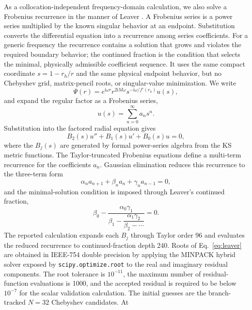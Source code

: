 \documentclass[12pt,a4paper]{article}
\newcommand{\ii}{\mathrm{i}}
\begin{document}
As a collocation-independent frequency-domain calculation, we also solve a Frobenius
recurrence in the manner of Leaver \cite{Leaver1985,Nollert1993}.  A Frobenius
series is a power series multiplied by the known singular behavior at an
endpoint.  Substitution converts the differential equation into a recurrence
among series coefficients.  For a generic frequency the recurrence contains a
solution that grows and violates the required boundary behavior; the continued
fraction is the condition that selects the minimal, physically admissible
coefficient sequence.  It uses the same compact
coordinate \(s=1-r_h/r\) and the same physical endpoint behavior, but no
Chebyshev grid, matrix-pencil roots, or singular-value minimization. We write
\begin{equation*}
\Psi(r)=e^{\ii\omega r}r^{2\ii M\omega}s^{-\ii\omega/f'(r_h)}u(s),
\end{equation*}
and expand the regular factor as a Frobenius series,
\begin{equation*}
u(s)=\sum_{n=0}^{\infty} a_n s^n.
\end{equation*}
Substitution into the factored radial equation gives
\begin{equation*}
B_2(s)u''+B_1(s)u'+B_0(s)u=0,
\end{equation*}
where the \(B_j(s)\) are generated by formal power-series algebra from the KS metric functions. The Taylor-truncated Frobenius equations define a multi-term recurrence for the coefficients \(a_n\). Gaussian elimination reduces this recurrence to the three-term form
\begin{equation*}
\alpha_n a_{n+1}+\beta_n a_n+\gamma_n a_{n-1}=0,
\end{equation*}
and the minimal-solution condition is imposed through Leaver's continued fraction,
\begin{equation}
\beta_0-\frac{\alpha_0\gamma_1}{\beta_1-\dfrac{\alpha_1\gamma_2}{\beta_2-\cdots}}=0.
\label{eq:leaver}
\end{equation}
The reported calculation expands each \(B_j\) through Taylor order 96 and
evaluates the reduced recurrence to continued-fraction depth 240.  Roots of
Eq.~\eqref{eq:leaver} are obtained in IEEE-754 double precision by applying the
MINPACK hybrid solver exposed by \texttt{scipy.optimize.root} to the real and
imaginary residual components.  The root tolerance is \(10^{-11}\), the maximum
number of residual-function evaluations is 1000, and the accepted residual is
required to be below \(10^{-7}\) for the scalar validation calculation.  The
initial guesses are the branch-tracked \(N=32\) Chebyshev candidates. At
\end{document}
